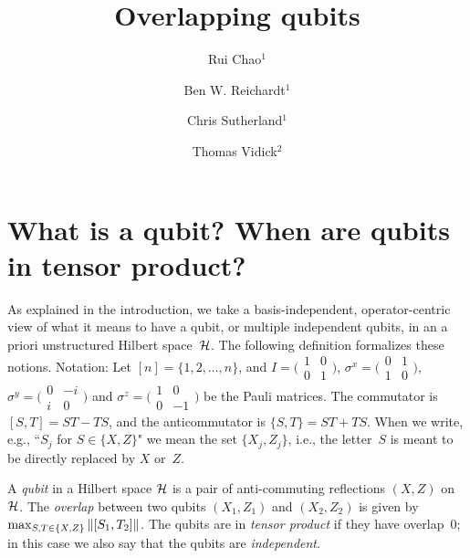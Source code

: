 \documentclass[preprintnumbers,11pt,onecolumn]{article}
\begin{document}
\def\compilefullpaper{}

\title{Overlapping qubits}
\author{Rui Chao$^1$ \and Ben W. Reichardt$^1$ \and Chris Sutherland$^1$ \and Thomas Vidick$^2$}
\date{}


\maketitle
{}





\section{What is a qubit?  When are qubits in tensor product?}

As explained in the introduction, we take a basis-independent, operator-centric view of what it means to have a qubit, or multiple independent qubits, in an a priori unstructured Hilbert space~${\mathcal H}$.  The following definition formalizes these notions.  Notation: Let $[n] = \{1, 2, \ldots, n\}$, and $I = \big(\begin{smallmatrix}1&0\\0&1\end{smallmatrix}\big)$, $\sigma^x = \big(\begin{smallmatrix}0&1\\1&0\end{smallmatrix}\big)$, $\sigma^y = \big(\begin{smallmatrix}0&-i\\i&0\end{smallmatrix}\big)$ and $\sigma^z = \big(\begin{smallmatrix}1&0\\0&-1\end{smallmatrix}\big)$ be the Pauli matrices.  The commutator is $[S, T] = S T - T S$, and the anticommutator is $\{S, T\} = S T + T S$.  When we write, e.g., ``$S_j$ for $S \in \{X, Z\}$" we mean the set $\{X_j, Z_j\}$, i.e., the letter~$S$ is meant to be directly replaced by $X$ or~$Z$.  

\begin{definition}
A \emph{qubit} in a Hilbert space ${\mathcal H}$ is a pair of anti-commuting reflections $(X, Z)$ on~${\mathcal H}$.  The \emph{overlap} between two qubits $(X_1, Z_1)$ and $(X_2, Z_2)$ is given by $\max_{S, T \in \{X, Z\}} {\| [S_1, T_2] \|}$.  The qubits are in \emph{tensor product} if they have overlap~$0$; in this case we also say that the qubits are \emph{independent}.  
\end{definition}
\end{document}
